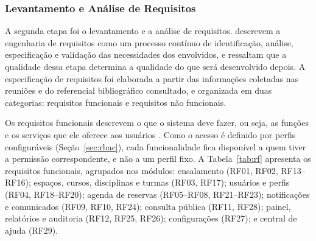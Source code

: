 \documentclass[
	12pt,				%
	twoside,			%
	openany,			%
	a4paper,			%
	chapter=TITLE,		%
	section=TITLE,		%
	subsection=TITLE,	%
	subsubsection=TITLE,%
	english,			%
	french,				%
	spanish,			%
	brazil,				%
	]{abntex2}
\begin{document}
\subsubsection{Levantamento e Análise de Requisitos}
\label{sec:requisitos}

A segunda etapa foi o levantamento e a análise de requisitos.  descrevem a engenharia de requisitos como um processo contínuo de identificação, análise, especificação e validação das necessidades dos envolvidos, e ressaltam que a qualidade dessa etapa determina a qualidade do que será desenvolvido depois. A especificação de requisitos foi elaborada a partir das informações coletadas nas reuniões e do referencial bibliográfico consultado, e organizada em duas categorias: requisitos funcionais e requisitos não funcionais.

Os requisitos funcionais descrevem o que o sistema deve fazer, ou seja, as funções e os serviços que ele oferece aos usuários \cite{sommerville2018}. Como o acesso é definido por perfis configuráveis (Seção~\ref{sec:rbac}), cada funcionalidade fica disponível a quem tiver a permissão correspondente, e não a um perfil fixo. A Tabela~\ref{tab:rf} apresenta os requisitos funcionais, agrupados nos módulos: ensalamento (RF01, RF02, RF13--RF16); espaços, cursos, disciplinas e turmas (RF03, RF17); usuários e perfis (RF04, RF18--RF20); agenda de reservas (RF05--RF08, RF21--RF23); notificações e comunicados (RF09, RF10, RF24); consulta pública (RF11, RF28); painel, relatórios e auditoria (RF12, RF25, RF26); configurações (RF27); e central de ajuda (RF29).
\end{document}
